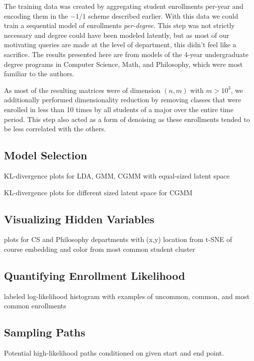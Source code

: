 \documentclass{edm_template}
\begin{document}
The training data was created by aggregating student enrollments per-year and encoding them in the $-1/1$ scheme described earlier. With this data we could train a sequential model of enrollments \textit{per-degree}. This step was not strictly necessary and degree could have been modeled latently, but as most of our motivating queries are made at the level of department, this didn't feel like a sacrifice. The results presented here are from models of the 4-year undergraduate degree programs in Computer Science, Math, and Philosophy, which were most familiar to the authors. 

As most of the resulting matrices were of dimension $(n,m)$ with $m > 10^3$, we additionally performed dimensionality reduction by removing classes that were enrolled in less than 10 times by all students of a major over the entire time period. This step also acted as a form of denoising as these enrollments tended to be less correlated with the others. 

\subsection{Model Selection}

KL-divergence plots for LDA, GMM, CGMM with equal-sized latent space

KL-divergence plots for different sized latent space for CGMM

\subsection{Visualizing Hidden Variables}

plots for CS and Philosophy departments with (x,y) location from t-SNE of course embedding and color from most common student cluster 

\subsection{Quantifying Enrollment Likelihood}

labeled log-likelihood histogram with examples of uncommon, common, and most common enrollments

\subsection{Sampling Paths}

Potential high-likelihood paths conditioned on given start and end point. 
\end{document}
